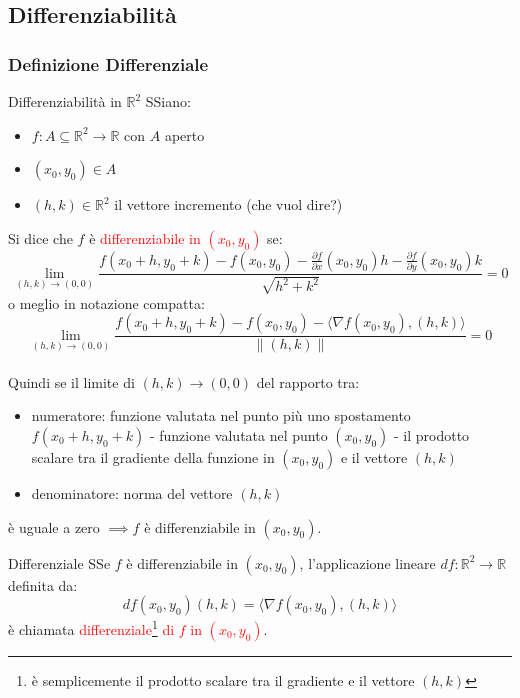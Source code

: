 \documentclass{article}  %
\begin{document}
\subsection{Differenziabilità}

\subsubsection{Definizione Differenziale}

\begin{theorem}{Differenziabilità in $\mathbb{R}^2$}
	SSiano:
	\begin{itemize}
		\item $f: A \subseteq \mathbb{R}^2 \to \mathbb{R}$ con $A$ aperto
		\item $(x_0,y_0) \in A$
		\item $(h,k) \in \mathbb{R}^2$ il vettore incremento (che vuol dire?)
	\end{itemize}
	Si dice che $f$ è \textcolor{red}{differenziabile in $(x_0,y_0)$} se:
	\[
		\lim_{(h,k) \to (0,0)} \frac{f(x_0+h, y_0+k)-f(x_0,y_0)- \frac{\partial f}{\partial x}(x_0,y_0)h - \frac{\partial f}{\partial y}(x_0,y_0)k}{\sqrt{h^2+k^2}} = 0
	\]
	o meglio in notazione compatta:
	\[
		\lim_{(h,k) \to (0,0)} \frac{f(x_0+h, y_0+k)-f(x_0,y_0)- \langle \nabla f(x_0,y_0), (h,k) \rangle}{\|(h,k)\|} = 0
	\]
	\\
	Quindi se il limite di $(h,k) \to (0,0)$ del rapporto tra:
	\begin{itemize}
		\item numeratore: funzione valutata nel punto più uno spostamento $f(x_0+h, y_0+k)$ - funzione valutata nel punto $(x_0,y_0)$ - il prodotto scalare tra il gradiente della funzione in $(x_0,y_0)$ e il vettore $(h,k)$
		\item denominatore: norma del vettore $(h,k)$
	\end{itemize}
	è uguale a zero $\implies f$ è differenziabile in $(x_0,y_0)$.
\end{theorem}

\begin{definition}{Differenziale}
	SSe $f$ è differenziabile in $(x_0,y_0)$, l'applicazione lineare  $df: \mathbb{R}^2 \to \mathbb{R}$ definita da:
	\[
		df(x_0,y_0)(h,k) = \langle \nabla f(x_0,y_0), (h,k) \rangle
	\]
	è chiamata \textcolor{red}{differenziale\footnote{è semplicemente il prodotto scalare tra il gradiente e il vettore $(h,k)$} di $f$ in $(x_0,y_0)$}.

\end{definition}
\end{document}
